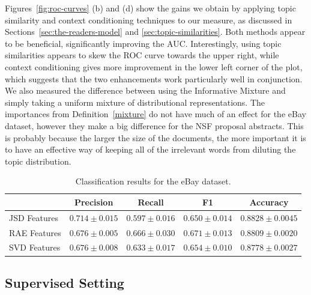 Figures~\ref{fig:roc-curves} (b) and (d)  
show the gains we obtain by applying topic
similarity and context conditioning techniques to our measure, as
discussed in Sections~\ref{sec:the-readers-model} and
\ref{sec:topic-similarities}. Both methods appear to be beneficial,
significantly improving the AUC. Interestingly, using
topic similarities appears to skew the ROC curve towards the upper
right, while context conditioning gives more improvement in the lower
left corner of the plot, which suggests that the two enhancements work
particularly well in conjunction. 
We also measured the difference between using 
the Informative Mixture and simply taking a uniform mixture of
distributional representations. The importances from
Definition~\ref{mixture} do not have much of an effect for the eBay
dataset, however they make a big difference
for the NSF proposal abstracts. This is probably because
the larger the size of the documents, the more important it is to
have an effective way of keeping all of the irrelevant words from
diluting the topic distribution. 

\begin{table}[t]
\renewcommand{\arraystretch}{1.3}
\centering
\begin{tabular}{l||c|c|c|c}
&Precision & Recall & F1 & Accuracy
\\ \hline \hline
JSD Features         &$\mathbf{0.714}\pm 0.015$&$0.597\pm 0.016$&$0.650\pm
0.014$& $\mathbf{0.8828}\pm 0.0045$\\
RAE Features         &$0.676\pm 0.005$&$\mathbf{0.666}\pm 0.030$&$\mathbf{0.671}\pm
0.013$&$0.8809\pm 0.0020$ \\
SVD Features             &$0.676\pm 0.008$&$0.633\pm 0.017$&$0.654\pm
0.010$&$0.8778\pm 0.0027$\\
\end{tabular}
\vspace{3mm}
\caption{Classification results for the eBay dataset.}
\label{tab:classification-results}
\end{table}

\subsection{Supervised Setting}
\label{sec:text-embeddings}


